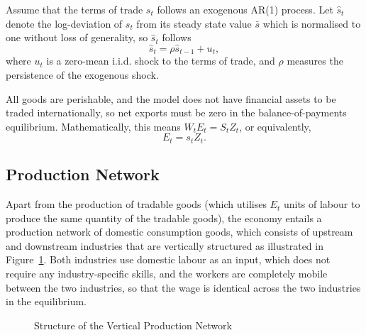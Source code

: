 \documentclass[a4paper, 12pt]{article}
\theoremstyle{definition*}
\begin{document}
Assume that the terms of trade $s_t$ follows an exogenous AR(1) process.
Let $\hat s_t$ denote the log-deviation of $s_t$ from its steady state value $\bar s$ which is normalised to one without loss of generality, so $\hat s_t$ follows
\begin{equation}\label{eq:tot_process}
  \hat s_t = \rho \hat s_{t-1} + u_t,
\end{equation}
where $u_t$ is a zero-mean i.i.d. shock to the terms of trade, and $\rho$ measures the persistence of the exogenous shock.

All goods are perishable, and the model does not have financial assets to be traded internationally, so net exports must be zero in the balance-of-payments equilibrium.
Mathematically, this means $W_tE_t = S_tZ_t$, or equivalently,
\begin{equation}\label{eq:balance_of_payments}
  E_t = s_tZ_t.
\end{equation}

\subsection{Production Network}
Apart from the production of tradable goods (which utilises $E_t$ units of labour to produce the same quantity of the tradable goods), the economy entails a production network of domestic consumption goods, which consists of upstream and downstream industries that are vertically structured as illustrated in Figure~\ref{fig:network_diagram}.
Both industries use domestic labour as an input, which does not require any industry-specific skills, and the workers are completely mobile between the two industries, so that the wage is identical across the two industries in the equilibrium.

\begin{figure}[t]
\centering
\caption{Structure of the Vertical Production Network}
\label{fig:network_diagram}
\end{figure}
\end{document}
